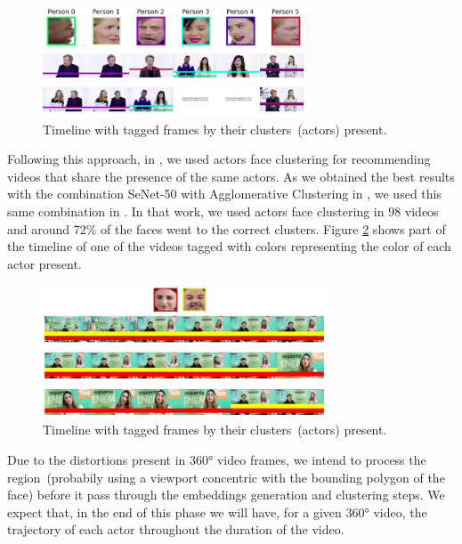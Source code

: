 \begin{figure}[!ht]
    \centering
    \includegraphics[width=0.7\textwidth]{img/timeline2.png}
    \caption{Timeline with tagged frames by their clusters~(actors) present.}
    \label{fig:timeline1}
\end{figure}



Following this approach, in \cite{mendes2020ISM}, we used actors face clustering for recommending videos that share the presence of the same actors. As we obtained the best results with the combination SeNet-50 with Agglomerative Clustering in \cite{mendes2020cluster}, we used this same combination in \cite{mendes2020ISM}. 
In that work, we used actors face clustering in 98 videos and around 72\% of the faces went to the correct clusters. Figure \ref{fig:timeline2} shows part of the timeline of one of the videos tagged with colors representing the color of each actor present.

\begin{figure}[!ht]
    \centering
    \includegraphics[width=0.75\textwidth]{img/educational_timeline2.png}
    \caption{Timeline with tagged frames by their clusters~(actors) present.}
    \label{fig:timeline2}
\end{figure}

Due to the distortions present in 360° video frames, we intend to process the region~(probabily using a viewport concentric with the bounding polygon of the face) before it pass through the embeddings generation and clustering steps. We expect that, in the end of this phase we will have, for a given 360° video, the trajectory of each actor throughout the duration of the video.

